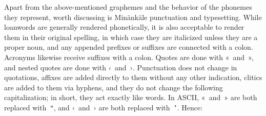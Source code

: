 Apart from the above-mentioned graphemes and the behavior of the phonemes they
represent, worth discussing is Min\"ank\"ale punctuation and typesetting. While
loanwords are generally rendered phonetically, it is also acceptable to render
them in their original spelling, in which case they are italicized unless they
are a proper noun, and any appended prefixes or suffixes are connected with a
colon. Acronyms likewise receive suffixes with a colon. Quotes are done with
«~and~», and nested quotes are done with ‹~and~›. Punctuation does not change in
quotations, affixes are added directly to them without any other indication,
clitics are added to them via hyphens, and they do not change the following
capitalization; in short, they act exactly like words. In ASCII, «~and~» are
both replaced with~\texttt{"}, and ‹~and~› are both replaced with~\texttt{'}.
Hence: \deprecate{}
